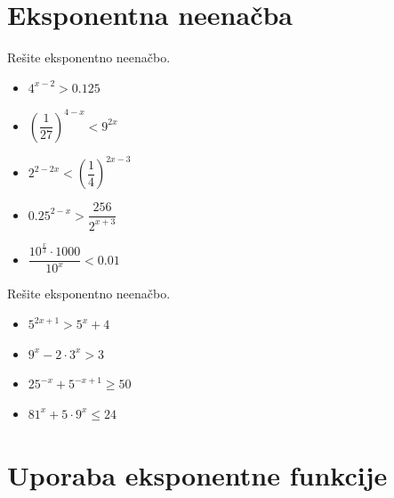     \newpage
\section{Eksponentna neenačba}


\newpage

    \begin{naloga}
        Rešite eksponentno neenačbo.
            
        \begin{itemize}
            \item $4^{x-2}>0.125$
            \item $\left(\dfrac{1}{27}\right)^{4-x}<9^{2x}$
            \item $2^{2-2x}<\left(\dfrac{1}{4}\right)^{2x-3}$ 
            \item $0.25^{2-x}>\dfrac{256}{2^{x+3}}$
            \item $\dfrac{10^\frac{x}{3}\cdot 1000}{10^x}<0.01$
        \end{itemize}

    \end{naloga}


    \begin{naloga}
        Rešite eksponentno neenačbo.
            
        \begin{itemize}
            \item $5^{2x+1}>5^x+4$
            \item $9^x-2\cdot 3^x>3$
            \item $25^{-x}+5^{-x+1}\geq 50$
            \item $81^x+5\cdot 9^x\leq 24$
        \end{itemize}


    \end{naloga}

\newpage
\section{Uporaba eksponentne funkcije}

\newpage